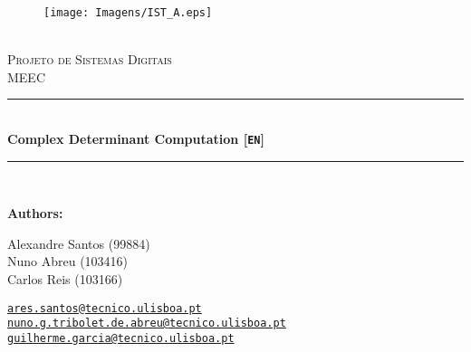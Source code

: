 \documentclass[12pt]{article}
\newcommand{\HRule}{\rule{\linewidth}{0.5mm}} %
\begin{document}
\begin{center}
    \begin{figure}
        \vspace{-1.0cm}
        \texttt{[image: Imagens/IST\_A.eps]} %
    \end{figure}
    \mbox{}\\[2.0cm]
    \textsc{\Huge Projeto de Sistemas Digitais}\\[2.5cm]
    \textsc{\LARGE MEEC}\\[2.0cm]
    \HRule\\[0.4cm]
    {\large \bf {\selectfont Complex Determinant Computation} [\texttt{EN}]}\\[0.2cm]
    \HRule\\[1.5cm]
\end{center}

\begin{flushleft}
    \textbf{\selectfont Authors:}
\end{flushleft}

\begin{center}
    \begin{minipage}{0.4\textwidth}
        \begin{flushleft}
            Alexandre Santos (99884)\\
            Nuno Abreu (103416)\\
            Carlos Reis (103166) \\
        \end{flushleft}
    \end{minipage}%
    \begin{minipage}{0.6\textwidth}
        \begin{flushright}
            \href{mailto:ares.santos@tecnico.ulisboa.pt}{\texttt{ares.santos@tecnico.ulisboa.pt}}\\
            \href{mailto:nuno.g.tribolet.de.abreu@tecnico.ulisboa.pt}{\texttt{nuno.g.tribolet.de.abreu@tecnico.ulisboa.pt}}\\
            \href{mailto:guilherme.garcia@tecnico.ulisboa.pt}{\texttt{guilherme.garcia@tecnico.ulisboa.pt}}\\
            
        \end{flushright}
    \end{minipage}


\end{center}
    
\end{document}

